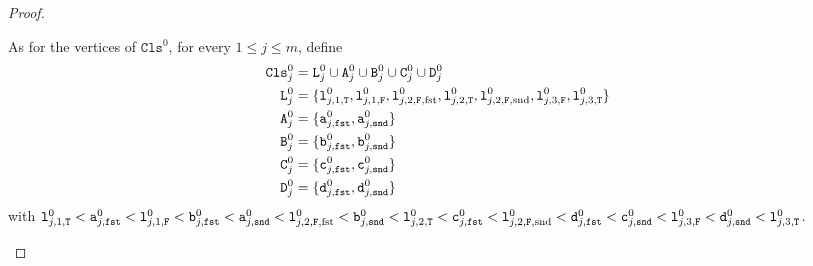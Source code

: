 \begin{proof}
\begin{mdframed}
    As for the vertices of $\texttt{Cls}^{0}$, for every $1 \leq j \leq m$, define
    \begin{align*}
      \texttt{Cls}^{0}_{j} &=
      \texttt{L}^{0}_{j} \cup
      \texttt{A}^{0}_{j} \cup
      \texttt{B}^{0}_{j} \cup
      \texttt{C}^{0}_{j} \cup
      \texttt{D}^{0}_{j}
      \\
      \texttt{L}^{0}_{j} &= \{
      \texttt{l}^{0}_{j,1,\texttt{T}},
      \texttt{l}^{0}_{j,1,\texttt{F}},
      \texttt{l}^{0}_{j,2,\texttt{F},\text{fst}},
      \texttt{l}^{0}_{j,2,\texttt{T}},
      \texttt{l}^{0}_{j,2,\texttt{F},\text{snd}},
      \texttt{l}^{0}_{j,3,\texttt{F}},
      \texttt{l}^{0}_{j,3,\texttt{T}}
      \}
      \\
      \texttt{A}^{0}_{j} &= \{\texttt{a}^{0}_{j,\texttt{fst}}, \texttt{a}^{0}_{j,\texttt{snd}}\}
      \\
      \texttt{B}^{0}_{j} &= \{\texttt{b}^{0}_{j,\texttt{fst}}, \texttt{b}^{0}_{j,\texttt{snd}}\}
      \\
      \texttt{C}^{0}_{j} &= \{\texttt{c}^{0}_{j,\texttt{fst}}, \texttt{c}^{0}_{j,\texttt{snd}}\}
      \\
      \texttt{D}^{0}_{j} &= \{\texttt{d}^{0}_{j,\texttt{fst}}, \texttt{d}^{0}_{j,\texttt{snd}}\}
    \end{align*}
    with
    $
    \texttt{l}^{0}_{j,1,\texttt{T}} <
    \texttt{a}^{0}_{j,\texttt{fst}} <
    \texttt{l}^{0}_{j,1,\texttt{F}} <
    \texttt{b}^{0}_{j,\texttt{fst}} <
    \texttt{a}^{0}_{j,\texttt{snd}} <
    \texttt{l}^{0}_{j,2,\texttt{F},\text{fst}} <
    \texttt{b}^{0}_{j,\texttt{snd}} <
    \texttt{l}^{0}_{j,2,\texttt{T}} <
    \texttt{c}^{0}_{j,\texttt{fst}} <
    \texttt{l}^{0}_{j,2,\texttt{F},\text{snd}} <
    \texttt{d}^{0}_{j,\texttt{fst}} <
    \texttt{c}^{0}_{j,\texttt{snd}} <
    \texttt{l}^{0}_{j,3,\texttt{F}} <
    \texttt{d}^{0}_{j,\texttt{snd}} <
    \texttt{l}^{0}_{j,3,\texttt{T}}
    $.


\end{mdframed}
\end{proof}
